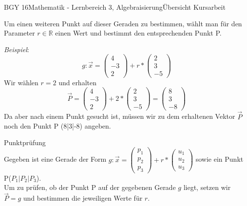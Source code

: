 \documentclass[oneside,openany,headings=optiontotoc,11pt,numbers=noenddot]{scrreprt}
\begin{document}
\begin{worksheet}{BGY 16}{Mathematik - Lernbereich 3, Algebraisierung}{Übersicht Kursarbeit}
\begin{framed}
			\par\bigskip\noindent
			Um einen weiteren Punkt auf dieser Geraden zu bestimmen, wählt man für den Parameter \(r \in \mathbb{R}\) einen Wert und bestimmt den entsprechenden Punkt P.\\
			\par\bigskip\noindent
			\textit{Beispiel}: \[g: \vec{x} = \left(\begin{array}{c}4\\-3\\2\end{array}\right) + r*\left(\begin{array}{c}2\\3\\-5\end{array}\right)\]
			Wir wählen \(r = 2\) und erhalten
			\[\vec{P} = \left(\begin{array}{c}4\\-3\\2\end{array}\right) + 2*\left(\begin{array}{c}2\\3\\-5\end{array}\right) = \left(\begin{array}{c}8\\3\\-8\end{array}\right)\]
			Da aber nach einem Punkt gesucht ist, müssen wir zu dem erhaltenen Vektor \(\vec{P}\) noch den Punkt P (8|3|-8) angeben.
		\end{framed}
		\begin{framed}
			\noindent
			\tiny{\color{codegray}Punktprüfung}\normalcolor\normalsize\\
			Gegeben ist eine Gerade der Form \(g: \vec{x} = \left(\begin{array}{c}p_1\\p_2\\p_3\end{array}\right) + r*\left(\begin{array}{c}u_1\\u_2\\u_3\end{array}\right)\) sowie ein Punkt P(\(P_1|P_2|P_3\)).\\
			Um zu prüfen, ob der Punkt P auf der gegebenen Gerade \(g\) liegt, setzen wir \(\vec{P} = g\) und bestimmen die jeweiligen Werte für \(r\).\\
			\par\bigskip\noindent

\end{framed}
\end{worksheet}
\end{document}
